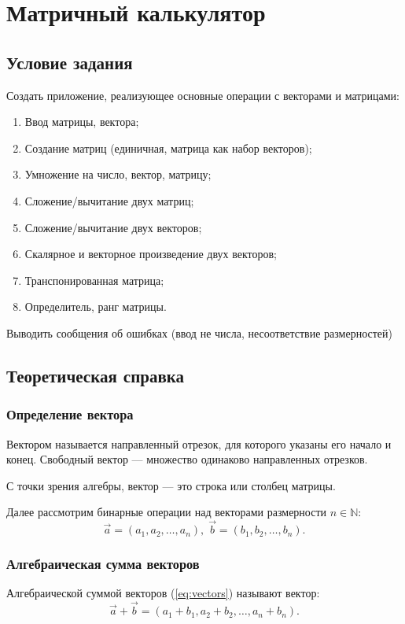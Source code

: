 \section{Матричный калькулятор}
\subsection{Условие задания}
Создать приложение,  реализующее основные операции с векторами и матрицами:

\begin{enumerate}
    \item Ввод матрицы, вектора;
    \item Создание матриц (единичная, матрица как набор векторов);
    \item Умножение на число, вектор, матрицу;
    \item Сложение/вычитание двух матриц;
    \item Сложение/вычитание двух векторов;
    \item Скалярное и векторное произведение двух векторов;
    \item Транспонированная матрица;
    \item Определитель, ранг матрицы.
\end{enumerate}

Выводить сообщения об ошибках (ввод не числа, несоответствие размерностей)

\subsection{Теоретическая справка}
\subsubsection{Определение вектора}
Вектором называется направленный отрезок, для которого указаны его начало и конец. Свободный вектор --- множество одинаково направленных отрезков.

С точки зрения алгебры, вектор --- это строка или столбец матрицы.

Далее рассмотрим бинарные операции над векторами размерности $n \in \mathbb{N}$:
\begin{equation}
    \label{eq:vectors}
    \Vec{a} = \left(a_1, a_2, \dots, a_n\right),\;
    \Vec{b} = \left(b_1, b_2, \dots, b_n\right).
\end{equation}

\subsubsection{Алгебраическая сумма векторов}
Алгебраической суммой векторов (\ref{eq:vectors}) называют вектор:
\begin{equation}
    \Vec{a}+\Vec{b} = \left(a_1 + b_1, a_2 + b_2, \dots, a_n + b_n\right).
\end{equation}

